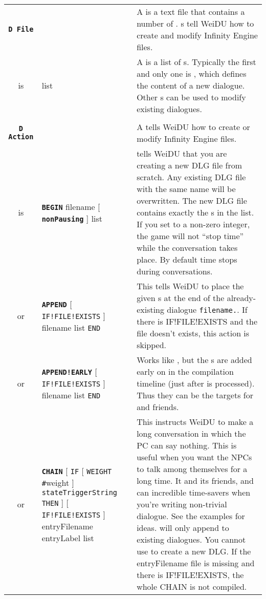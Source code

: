 \documentclass{article}
\def\ttref#1{\ahrefloc{#1}{\tt #1}}
\def\DEFINE#1{{\tt \bf #1}\label{#1}\index{#1}}
\def\t#1{{\tt #1}}
\def\Slist{{\color{red} list }}
\def\Ob{{\color{red} [ }}
\def\Oe{{\color{red} ] }}
\begin{document}
\begin{tabular}{cp{10in}|p{10in}}

\DEFINE{D File} & & 
  A \ttref{D file} is a text file that contains a number of \ttref{D
  Actions}. \ttref{D File}s tell WeiDU how to create and modify Infinity
  Engine \ttref{DLG} files.  \\

  is & \ttref{D Action} \Slist & 
  A \ttref{D File} is a list of \ttref{D Action}s. Typically the first and
  only one is \ttref{BEGIN}, which defines the content of a new dialogue.
  Other \ttref{D Action}s can be used to modify existing dialogues. \\

\\

\DEFINE{D Action} & & 
  A \ttref{D Action} tells WeiDU how to create or modify Infinity Engine
  \ttref{DLG} files. \\

  is & \DEFINE{BEGIN} filename \Ob \DEFINE{nonPausing} \Oe \ttref{state} \Slist & 
    \ttref{BEGIN} tells WeiDU that you are creating a new DLG file from
    scratch. Any existing DLG file with the same name will be overwritten. 
    The new DLG file contains exactly the \ttref{state}s in the list. 
    If you set \ttref{nonPausing} to a non-zero integer, the game will not
    ``stop time'' while the conversation takes place. By default time stops
    during conversations.  \\

  or   & \DEFINE{APPEND} \Ob \t{IF!FILE!EXISTS} \Oe filename \ttref{state} \Slist {\tt END} &
    This tells WeiDU to place the given \ttref{state}s at the end of the
    already-existing dialogue \t{filename.}\ttref{DLG}. If there is IF!FILE!EXISTS
    and the file doesn't exists, this action is skipped. \\

  or   & \DEFINE{APPEND!EARLY} \Ob \t{IF!FILE!EXISTS} \Oe filename \ttref{state} \Slist {\tt END} &
    Works like \ttref{APPEND}, but the \ttref{state}s are added early on in
    the compilation timeline (just after \ttref{BEGIN} is processed). Thus
    they can be the targets for \ttref{INTERJECT!COPY!TRANS} and friends.
    \\ 

  or & \DEFINE{CHAIN}
    \Ob {\tt IF} \Ob {\tt WEIGHT} {\tt \#}weight \Oe {\tt
    stateTriggerString}  {\tt THEN} \Oe \Ob \t{IF!FILE!EXISTS} \Oe
    entryFilename entryLabel \ttref{chainText} \Slist
    \ttref{chainEpilogue} &
  This instructs WeiDU to make a long conversation in which the PC can say
  nothing. This is useful when you want the NPCs to talk among themselves
  for a long time. It and its friends, \ttref{INTERJECT} and
  \ttref{INTERJECT!COPY!TRANS} can incredible time-savers when you're
  writing non-trivial dialogue. See the examples for ideas. \ttref{CHAIN}
  will only append to existing dialogues. You cannot use \ttref{CHAIN} to
  create a new DLG. If the entryFilename file is missing and there is IF!FILE!EXISTS,
  the whole CHAIN is not compiled.
  \\


\end{tabular}
\end{document}
